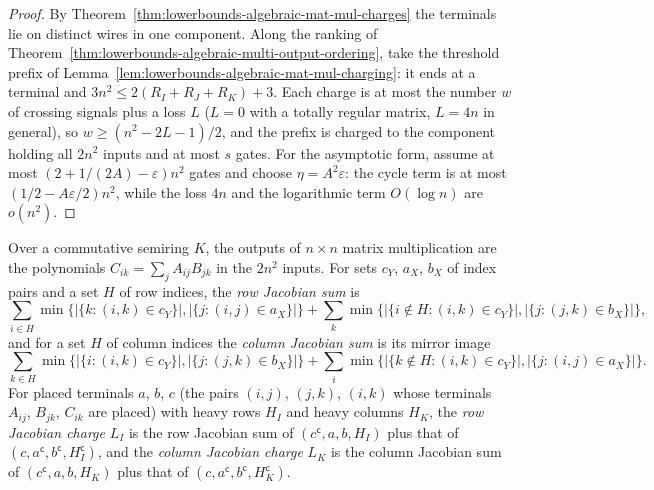 \begin{proof}
  \leanok
  By Theorem~\ref{thm:lowerbounds-algebraic-mat-mul-charges} the terminals
  lie on distinct wires in one component. Along the ranking of
  Theorem~\ref{thm:lowerbounds-algebraic-multi-output-ordering}, take the
  threshold prefix of Lemma~\ref{lem:lowerbounds-algebraic-mat-mul-charging}:
  it ends at a terminal and $3n^2\le2(R_I+R_J+R_K)+3$. Each charge is at most
  the number $w$ of crossing signals plus a loss $L$ ($L=0$ with a totally
  regular matrix, $L=4n$ in general), so $w\ge(n^2-2L-1)/2$, and the prefix
  is charged to the component holding all $2n^2$ inputs and at most $s$
  gates. For the asymptotic form, assume at most
  $(2+1/(2A)-\varepsilon)n^2$ gates and choose $\eta=A^2\varepsilon$: the
  cycle term is at most $(1/2-A\varepsilon/2)n^2$, while the loss $4n$ and
  the logarithmic term $O(\log n)$ are $o(n^2)$.
\end{proof}

\begin{definition}
  \label{def:lowerbounds-algebraic-mat-mul-jacobian-charges}
  \leanok
  Over a commutative semiring $K$, the outputs of $n\times n$ matrix
  multiplication are the polynomials $C_{ik}=\sum_jA_{ij}B_{jk}$ in the
  $2n^2$ inputs. For sets $c_Y$, $a_X$, $b_X$ of index pairs and a set $H$ of
  row indices, the \emph{row Jacobian sum} is
  \[
    \sum_{i\in H}\min\{|\{k:(i,k)\in c_Y\}|,|\{j:(i,j)\in a_X\}|\}
    + \sum_k\min\{|\{i\notin H:(i,k)\in c_Y\}|,|\{j:(j,k)\in b_X\}|\} ,
  \]
  and for a set $H$ of column indices the \emph{column Jacobian sum} is its
  mirror image
  \[
    \sum_{k\in H}\min\{|\{i:(i,k)\in c_Y\}|,|\{j:(j,k)\in b_X\}|\}
    + \sum_i\min\{|\{k\notin H:(i,k)\in c_Y\}|,|\{j:(i,j)\in a_X\}|\} .
  \]
  For placed terminals $a$, $b$, $c$ (the pairs $(i,j)$, $(j,k)$, $(i,k)$
  whose terminals $A_{ij}$, $B_{jk}$, $C_{ik}$ are placed) with heavy rows
  $H_I$ and heavy columns $H_K$, the \emph{row Jacobian charge} $L_I$ is the
  row Jacobian sum of $(c^{\mathsf c},a,b,H_I)$ plus that of
  $(c,a^{\mathsf c},b^{\mathsf c},H_I^{\mathsf c})$, and the \emph{column
  Jacobian charge} $L_K$ is the column Jacobian sum of
  $(c^{\mathsf c},a,b,H_K)$ plus that of
  $(c,a^{\mathsf c},b^{\mathsf c},H_K^{\mathsf c})$.
\end{definition}

